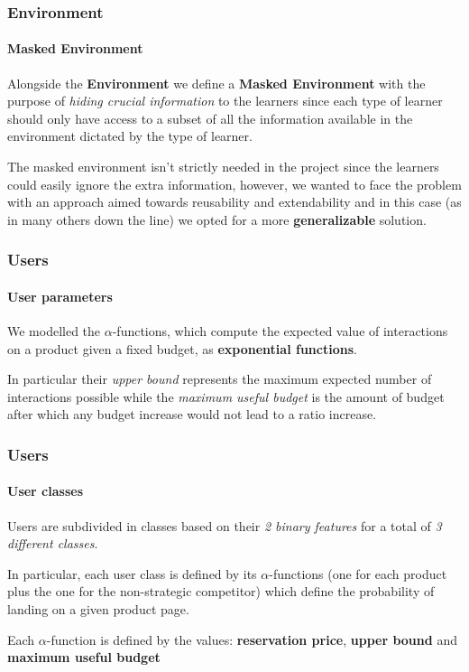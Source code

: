 
\begin{frame}

\frametitle{Environment}
\framesubtitle{Masked Environment}

Alongside the \textbf{Environment} we define a \textbf{Masked Environment} with the purpose of \textit{hiding crucial information} to the learners since each type of learner should only have access to a subset of all the information available in the environment dictated by the type of learner.

The masked environment isn't strictly needed in the project since the learners could easily ignore the extra information, however, we wanted to face the problem with an approach aimed towards reusability and extendability and in this case (as in many others down the line) we opted for a more \textbf{generalizable} solution.

\end{frame}


\begin{frame}

\frametitle{Users}
\framesubtitle{User parameters}

We modelled the $\alpha$-functions, which compute the expected value of interactions on a product given a fixed budget, as \textbf{exponential functions}.

In particular their \textit{upper bound} represents the maximum expected number of interactions possible while the \textit{maximum useful budget} is the amount of budget after which any budget increase would not lead to a ratio increase.

\end{frame}


\begin{frame}

\frametitle{Users}
\framesubtitle{User classes}

Users are subdivided in classes based on their \textit{2 binary features} for a total of \textit{3 different classes}.

In particular, each user class is defined by its $\alpha$-functions (one for each product plus the one for the non-strategic competitor) which define the probability of landing on a given product page.

Each $\alpha$-function is defined by the values: \textbf{reservation price}, \textbf{upper bound} and \textbf{maximum useful budget}

\end{frame}

